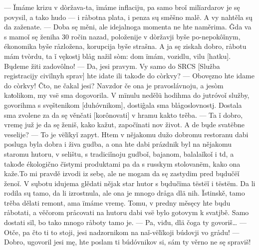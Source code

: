 — Ïmáme krizu v dòržava-ta, ïmáme inflaciju, pa samo broǐ milïardarov je sę povysil, a tako hudo — i råbotna plata, i penza sų směšno malě. A vy nahtěla sų da zaženate.
— Doba sę měni, ale idejalnoga momenta ne hte naměrima. Ĝda va s mamoǐ sę ženiha 30 ročin nazad, položenije v dòržavji byše po-nepokôǐnym, ékonomika byše råzložena, korupcija byše strašna. A ja sę ziskah dobro, råbotu mám tvòrdu, ta ǐ vękostj blåg nažil sòm: dom ïmám, vozidlu, vilu [hatku]. Bųdeme žiti zadovôlno!
— Da, jesi pravym. Vy samo do SRCS [Služba registracijy civïlnyh sprav] hte idate ili takođe do còrkvy?
— Obovęzno hte idame do còrkvy! Čto, ne čakal jesi? Navzdor če ona je pravoslávnoju, a jesòm kaŧolikom, my vsë sma dogovorila. V mïnulu nedělü hodihma do jutróvoǐ služby, govorihma s svęštenikom [duhóvnikom], dostiĝala sma blågoslovnostj. Dostala sma zvolene za da sę věnčati [korônovati] v hramu kakto trěba.
— Ta ǐ dobro, vremę juž je da sę ženiš, kako kažut, započïnati nov život. A de bųde svatëbne veselije?
— To je vëlïkyǐ zapyt. Htem v nějakomu dužo dobromu restoranu dabi posluga byla dobra i živa gudba, a ona hte dabi prázdnik byl na nějakomu staromu hutoru, v selištu, s tradiciǐnoju gudboǐ, bajanom, balalaǐkoǐ i td, a takođe ékologično čïstymi produktami pa da s russkym stolovanëm, kako ona kaže.To mi pravdě izvodi iz sebę, ale ne mogam da sę zastydim pred bųdučëǐ ženoǐ. V sųbotu idujema glědati nějak star hutor s bųdučïma tëstëǐ i tëstëm. Da li rodila sų tamo, da li izrostnula, ale ona je mnogo dråga dlä nih. Ïstinskě, tamo trěba dělati remont, ama ïmáme vremę. Tomu, v predny měsęcy hte bųdu råbotati, a věčorom pråcovati na hutoru dabi vsë bylo gotovym k svatjbě. Samo dostati sïl, bo tako mnogo råboty tamo je.
— Pa, viđu, dlä čoga ty govoriš…
— Otče, pa čto ti to stoji, jesi nadzornikom na naǐ-vëlïkoji búdovji vo grådu!
— Dobro, ugovoril jesi mę, hte poslam ti búdóvnikov si, sám ty věrno ne sę spraviš!







